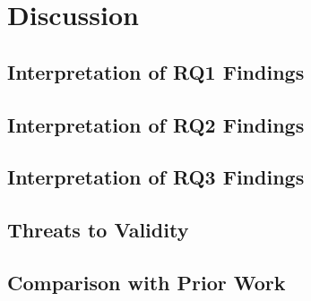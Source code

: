 \chapter{Discussion}
\label{chap:discussion}


\section{Interpretation of RQ1 Findings}

\section{Interpretation of RQ2 Findings}

\section{Interpretation of RQ3 Findings}

\section{Threats to Validity}

\section{Comparison with Prior Work}
